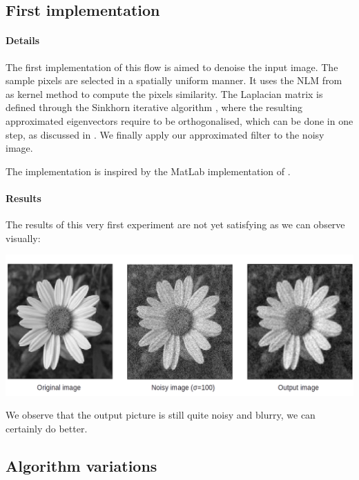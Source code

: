 \documentclass[]{article}
\begin{document}


\subsection{First implementation}

\paragraph{Details}
The first implementation of this flow is aimed to denoise the input image.
The sample pixels are selected in a spatially uniform manner.
It uses the NLM from \cite{buades_review_2005} as kernel method to compute the pixels similarity.
The Laplacian matrix is defined through the Sinkhorn iterative algorithm \cite{milanfar_symmetrizing_2013}, where the resulting approximated eigenvectors require to be orthogonalised, which can be done in one step, as discussed in \cite{fowlkes_spectral_2004}.
We finally apply our approximated filter to the noisy image.

The implementation is inspired by the MatLab implementation of \cite{glide_2014}.

\paragraph{Results}
The results of this very first experiment are not yet satisfying as we can observe visually:

\includegraphics[width=\textwidth]{img/firstimpl.png} %

We observe that the output picture is still quite noisy and blurry, we can certainly do better.

\subsection{Algorithm variations}
\end{document}

